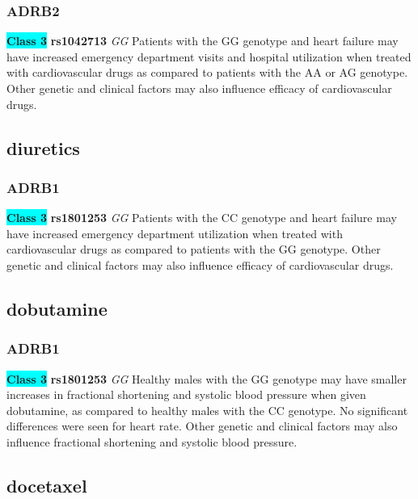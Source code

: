 \documentclass{book}
\begin{document}
\subsubsection{ ADRB2 }

\begin{center}
\textbf{\colorbox{cyan} {Class 3}} \textbf{ rs1042713 } \textit{ GG }
Patients with the GG genotype and heart failure may have increased emergency department visits and hospital utilization when treated with cardiovascular drugs as compared to patients with the AA or AG genotype. Other genetic and clinical factors may also influence efficacy of cardiovascular drugs.


\end{center}\subsection{ diuretics }


\subsubsection{ ADRB1 }

\begin{center}
\textbf{\colorbox{cyan} {Class 3}} \textbf{ rs1801253 } \textit{ GG }
Patients with the CC genotype and heart failure may have increased emergency department utilization when treated with cardiovascular drugs as compared to patients with the GG genotype. Other genetic and clinical factors may also influence efficacy of cardiovascular drugs.


\end{center}\subsection{ dobutamine }


\subsubsection{ ADRB1 }

\begin{center}
\textbf{\colorbox{cyan} {Class 3}} \textbf{ rs1801253 } \textit{ GG }
Healthy males with the GG genotype may have smaller increases in fractional shortening and systolic blood pressure when given dobutamine, as compared to healthy males with the CC genotype. No significant differences were seen for heart rate. Other genetic and clinical factors may also influence fractional shortening and systolic blood pressure.


\end{center}\subsection{ docetaxel }
\end{document}
